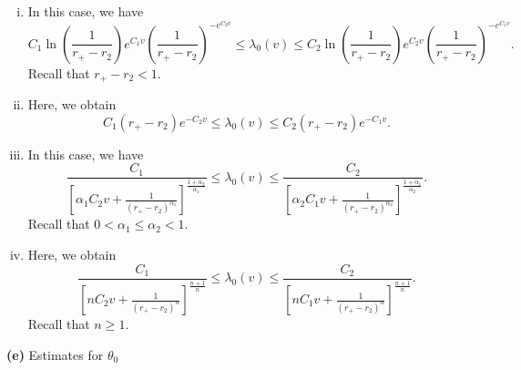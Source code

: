 \documentclass[a4paper,11pt,oneside,reqno]{amsart}
\begin{document}
\begin{enumerate}[(i)]
\item
In this case, we have
$$
C_1\ln\left({\textstyle\frac{1}{r_+-r_2}}\right)e^{C_1v}
\left({\textstyle\frac{1}{r_+-r_2}}\right)^{-e^{C_2v}}\leq 
\lambda_0(v)\leq C_2\ln\left({\textstyle\frac{1}{r_+-r_2}}\right)e^{C_2v}
\left({\textstyle\frac{1}{r_+-r_2}}\right)^{-e^{C_1v}}.
$$
Recall that $r_+-r_2<1$.
\item
Here, we obtain
\begin{equation}\label{l_ii}
C_1(r_+-r_2)e^{-C_2v}\leq\lambda_0(v)\leq C_2(r_+-r_2)e^{-C_1v}.
\end{equation}
\item
In this case, we have
\begin{equation}\label{l_iii}
\frac{C_1}{\left[\alpha_1C_2v+
\frac{1}{(r_+-r_2)^{\alpha_1}}\right]^{\frac{1+\alpha_2}{\alpha_1}}}
\leq
\lambda_0(v)\leq \frac{C_2}{\left[\alpha_2C_1v+
\frac{1}{(r_+-r_2)^{\alpha_2}}\right]^{\frac{1+\alpha_1}{\alpha_2}}}.
\end{equation}
Recall that $0<\alpha_1\leq\alpha_2<1$.
\item
Here, we obtain
$$
\frac{C_1}{\left[nC_2v+
\frac{1}{(r_+-r_2)^{n}}\right]^{\frac{n+1}{n}}}
\leq
\lambda_0(v)\leq \frac{C_2}{\left[nC_1v+
\frac{1}{(r_+-r_2)^{n}}\right]^{\frac{n+1}{n}}}.
$$
Recall that $n\geq 1$.
\end{enumerate}

\bigskip

\begin{center}
{\bf (e)} Estimates for $\theta_0$
\end{center}
\end{document}
